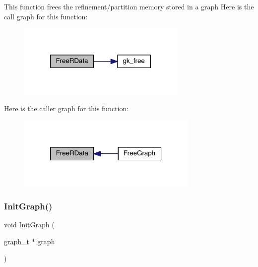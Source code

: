 This function frees the refinement/partition memory stored in a graph Here is the call graph for this function\+:\nopagebreak
\begin{figure}[H]
\begin{center}
\leavevmode
\includegraphics[width=232pt]{a00849_a12a6bda050dc470113f4d1cd5aa5777d_cgraph}
\end{center}
\end{figure}
Here is the caller graph for this function\+:\nopagebreak
\begin{figure}[H]
\begin{center}
\leavevmode
\includegraphics[width=248pt]{a00849_a12a6bda050dc470113f4d1cd5aa5777d_icgraph}
\end{center}
\end{figure}
\mbox{\label{a00849_af046766ada304a0cf49db44b544810a8}} 
\subsubsection{\texorpdfstring{Init\+Graph()}{InitGraph()}}
{\footnotesize\ttfamily void Init\+Graph (\begin{DoxyParamCaption}\item[{\hyperlink{a00734}{graph\+\_\+t} $\ast$}]{graph }\end{DoxyParamCaption})}

